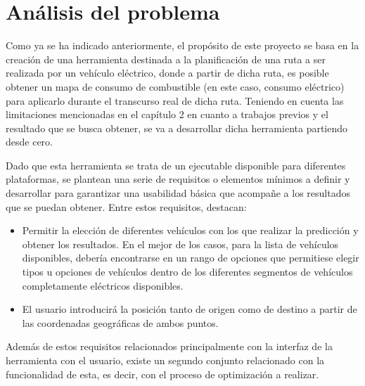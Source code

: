 \documentclass[11pt,spanish,listoffigures,listoftables]{tfgetsinf}
\begin{document}

\chapter{Análisis del problema}
\label{AnalisisProblema}
Como ya se ha indicado anteriormente, el propósito de este proyecto se basa en la creación de una herramienta destinada a la planificación de una ruta a ser realizada por un vehículo eléctrico, donde a partir de dicha ruta, es posible obtener un mapa de consumo de combustible (en este caso, consumo eléctrico) para aplicarlo durante el transcurso real de dicha ruta. Teniendo en cuenta las limitaciones mencionadas en el capítulo 2 en cuanto a trabajos previos y el resultado que se busca obtener, se va a desarrollar dicha herramienta partiendo desde cero.

Dado que esta herramienta se trata de un ejecutable disponible para diferentes plataformas, se plantean una serie de requisitos o elementos mínimos a definir y desarrollar para garantizar una usabilidad básica que acompañe a los resultados que se puedan obtener. Entre estos requisitos, destacan:

\begin{itemize}
    \item Permitir la elección de diferentes vehículos con los que realizar la predicción y obtener los resultados. En el mejor de los casos, para la lista de vehículos disponibles, debería encontrarse en un rango de opciones que permitiese elegir tipos u opciones de vehículos dentro de los diferentes segmentos de vehículos completamente eléctricos disponibles.
    \item El usuario introducirá la posición tanto de origen como de destino a partir de las coordenadas geográficas de ambos puntos.
\end{itemize}

Además de estos requisitos relacionados principalmente con la interfaz de la herramienta con el usuario, existe un segundo conjunto relacionado con la funcionalidad de esta, es decir, con el proceso de optimización a realizar.
\end{document}
